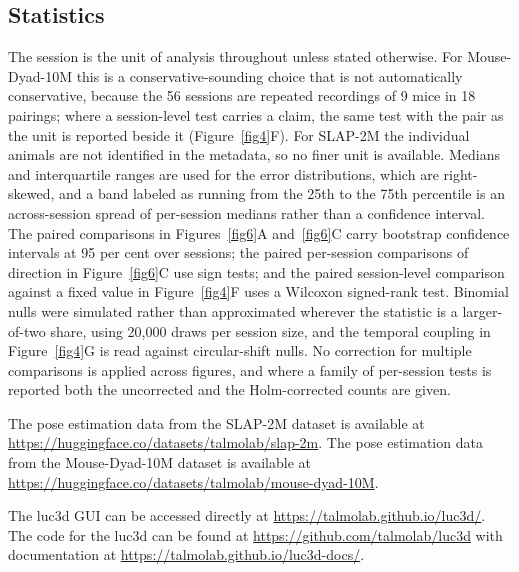 \documentclass[pdflatex, sn-nature]{sn-jnl}
\theoremstyle{thmstyleone}%
\theoremstyle{thmstyletwo}%
\theoremstyle{thmstylethree}%
\begin{document}
\subsection{Statistics}\label{methods-stats}

The session is the unit of analysis throughout unless stated otherwise. For Mouse-Dyad-10M this is a conservative-sounding choice that is not automatically conservative, because the 56 sessions are repeated recordings of 9 mice in 18 pairings; where a session-level test carries a claim, the same test with the pair as the unit is reported beside it (Figure~\ref{fig4}F). For SLAP-2M the individual animals are not identified in the metadata, so no finer unit is available. Medians and interquartile ranges are used for the error distributions, which are right-skewed, and a band labeled as running from the 25th to the 75th percentile is an across-session spread of per-session medians rather than a confidence interval. The paired comparisons in Figures~\ref{fig6}A and~\ref{fig6}C carry bootstrap confidence intervals at 95 per cent over sessions; the paired per-session comparisons of direction in Figure~\ref{fig6}C use sign tests; and the paired session-level comparison against a fixed value in Figure~\ref{fig4}F uses a Wilcoxon signed-rank test. Binomial nulls were simulated rather than approximated wherever the statistic is a larger-of-two share, using 20,000 draws per session size, and the temporal coupling in Figure~\ref{fig4}G is read against circular-shift nulls. No correction for multiple comparisons is applied across figures, and where a family of per-session tests is reported both the uncorrected and the Holm-corrected counts are given.

\backmatter


The pose estimation data from the SLAP-2M dataset is available at \hyperlink{https://huggingface.co/datasets/talmolab/slap-2m}{https://huggingface.co/datasets/talmolab/slap-2m}. The pose estimation data from the Mouse-Dyad-10M dataset is available at \hyperlink{https://huggingface.co/datasets/talmolab/mouse-dyad-10M}{https://huggingface.co/datasets/talmolab/mouse-dyad-10M}.

The luc3d GUI can be accessed directly at \hyperlink{https://talmolab.github.io/luc3d/}{https://talmolab.github.io/luc3d/}. The code for the luc3d can be found at \hyperlink{https://github.com/talmolab/luc3d}{https://github.com/talmolab/luc3d} with documentation at \hyperlink{https://talmolab.github.io/luc3d-docs/}{https://talmolab.github.io/luc3d-docs/}. 
\end{document}
